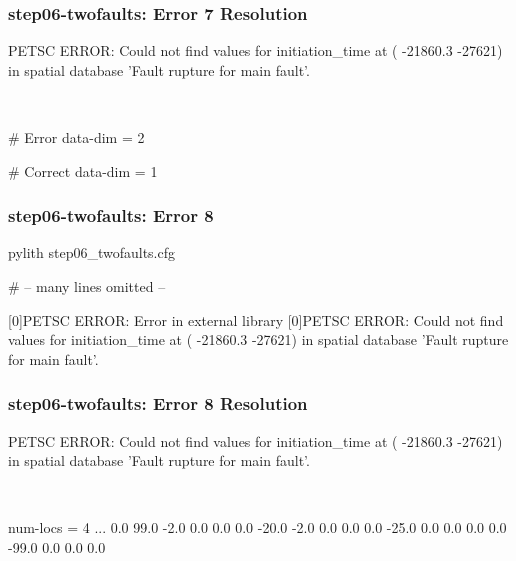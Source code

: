 \documentclass[aspectratio=169]{beamer}
\begin{document}
\begin{frame}[t,fragile]
  \frametitle{{\ttfamily step06-twofaults}: Error 7 Resolution}

  \tserror
  \begin{pyrejournal}
[0]PETSC ERROR: Could not find values for initiation_time at (  -21860.3  -27621) in spatial database 'Fault rupture for main fault'.
  \end{pyrejournal}

  \pause\\[1pt]

  \begin{cfgcode}
    # Error
    data-dim = 2
    
    # Correct
    data-dim = 1
  \end{cfgcode}

\end{frame}


\begin{frame}[fragile]
  \frametitle{{\ttfamily step06-twofaults}: Error 8}

\begin{pyrejournal}
pylith step06_twofaults.cfg

# -- many lines omitted --

[0]PETSC ERROR: Error in external library
[0]PETSC ERROR: Could not find values for initiation_time at (  -21860.3  -27621) in spatial database 'Fault rupture for main fault'.
\end{pyrejournal}

\end{frame}


\begin{frame}[t,fragile]
  \frametitle{{\ttfamily step06-twofaults}: Error 8 Resolution}

  \tserror
  \begin{pyrejournal}
[0]PETSC ERROR: Could not find values for initiation_time at (  -21860.3  -27621) in spatial database 'Fault rupture for main fault'.
  \end{pyrejournal}

  \pause\\[1pt]

  \begin{cfgcode}
num-locs = 4
...
0.0   99.0     -2.0       0.0   0.0
0.0  -20.0     -2.0       0.0   0.0
0.0  -25.0      0.0       0.0   0.0
0.0  -99.0      0.0       0.0   0.0
  \end{cfgcode}

\end{frame}
\end{document}
